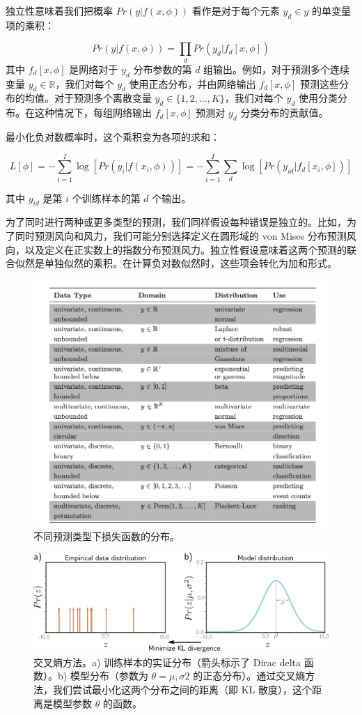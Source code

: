 独立性意味着我们把概率 \(Pr(y|f(x, \phi))\) 看作是对于每个元素 \(y_d \in y\) 的单变量项的乘积：

\begin{equation}
Pr(y|f(x, \phi)) = \prod_{d} Pr(y_d|f_d[x, \phi]) 
\end{equation}
其中 \(f_d[x, \phi]\) 是网络对于 \(y_d\) 分布参数的第 \(d\) 组输出。例如，对于预测多个连续变量 \(y_d \in \mathbb{R}\)，我们对每个 \(y_d\) 使用正态分布，并由网络输出 \(f_d[x, \phi]\) 预测这些分布的均值。对于预测多个离散变量 \(y_d \in \{1, 2, \ldots, K\}\)，我们对每个 \(y_d\) 使用分类分布。在这种情况下，每组网络输出 \(f_d[x, \phi]\) 预测对 \(y_d\) 分类分布的贡献值。

最小化负对数概率时，这个乘积变为各项的求和：

\begin{equation}
L[\phi] = -\sum_{i=1}^{I} \log [Pr(y_i|f(x_i, \phi))] = -\sum_{i=1}^{I} \sum_{d} \log [Pr(y_{id}|f_d[x_i, \phi])] 
\end{equation}

其中 \(y_{id}\) 是第 \(i\) 个训练样本的第 \(d\) 个输出。

为了同时进行两种或更多类型的预测，我们同样假设每种错误是独立的。比如，为了同时预测风向和风力，我们可能分别选择定义在圆形域的 von Mises 分布预测风向，以及定义在正实数上的指数分布预测风力。独立性假设意味着这两个预测的联合似然是单独似然的乘积。在计算负对数似然时，这些项会转化为加和形式。

\begin{figure}[ht!]
	\centering
	\includegraphics[width=0.7\linewidth]{png/chapter5/511.png}
	\caption{不同预测类型下损失函数的分布。}
\end{figure}


\begin{figure}[ht!]
	\centering
	\includegraphics[width=0.7\linewidth]{png/chapter5/LossCrossEntropy.png}
	\caption{交叉熵方法。a) 训练样本的实证分布（箭头标示了 Dirac delta 函数）。b) 模型分布（参数为 \(\theta = \mu, \sigma2\) 的正态分布）。通过交叉熵方法，我们尝试最小化这两个分布之间的距离（即 KL 散度），这个距离是模型参数 \(\theta\) 的函数。}
\end{figure}



